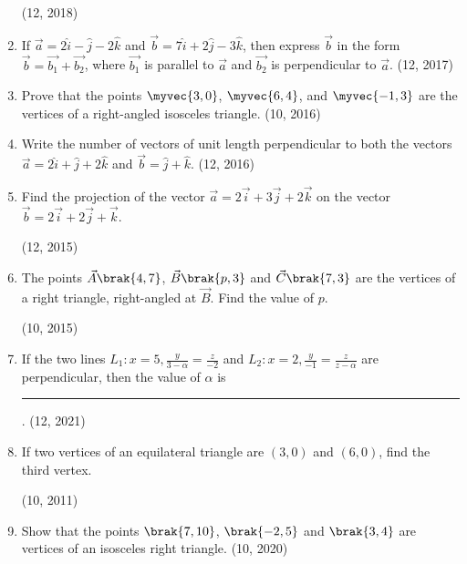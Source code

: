 \begin{enumerate}[label=\thesubsection.\arabic*, ref=\thesubsection.\theenumi]
\hfill (12, 2018) 
    \item If $\vec{a} = 2\hat{i} - \hat{j} - 2\hat{k}$ and $\vec{b} = 7\hat{i} + 2\hat{j} - 3\hat{k}$, then express $\vec{b}$ in the form $\vec{b} = \vec{b_1} + \vec{b_2}$, where $\vec{b_1}$ is parallel to $\vec{a}$ and $\vec{b_2}$ is perpendicular to $\vec{a}$. \hfill (12, 2017)
    \item Prove that the points $\myvec{3,0}$, $\myvec{6,4}$, and $\myvec{-1,3}$ are the vertices of a right-angled isosceles triangle. \hfill (10, 2016)
\item Write the number of vectors of unit length perpendicular to both the vectors
          $\vec{a}  = 2 \hat{i} + \hat{j} +2\hat{k}$  and 
          $\vec{b}  = \hat{j}+\hat{k}$.
\hfill (12, 2016)
\item Find the projection of the vector $\vec{a}=2\overrightarrow{i}+3\overrightarrow{j}+2\overrightarrow{k}$ on the vector $\vec{b}=2\overrightarrow{i}+2\overrightarrow{j}+\overrightarrow{k}$.

	\hfill (12, 2015)
\item The points $\vec{A}\brak{4, 7}$, $\vec{B}\brak{p, 3}$ and $\vec{C}\brak{7, 3}$ are the vertices of a right triangle, right-angled at $\vec{B}$. Find the value of $p$.

	\hfill (10, 2015)
\item If the two lines
     $L_1 : x=5,\frac{y}{3-\alpha}=\frac{z}{-2}$ and
     $L_2 : x=2,\frac{y}{-1}=\frac{z}{z-\alpha}$ 
are perpendicular, then the value of $\alpha$  is \rule{1cm}{0.2pt}.
\hfill (12, 2021)
    \item If two vertices of an equilateral triangle are $(3,0)$ and $(6,0)$, find the third vertex.   

\hfill (10, 2011)
\item Show that the points $\brak{7, 10}$, $\brak{-2, 5}$ and $\brak{3, 4}$ are vertices of an isosceles right triangle.
\hfill (10, 2020)
\end{enumerate}
